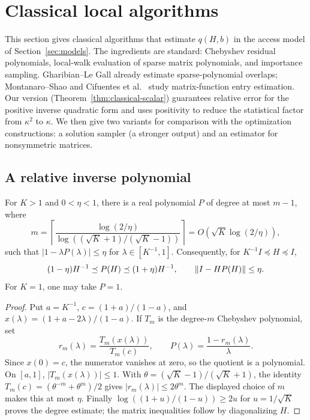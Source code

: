 \section{Classical local algorithms}\label{sec:classical}
This section gives classical algorithms that estimate $q(H,b)$ in the
access model of Section~\ref{sec:models}. The ingredients are standard:
Chebyshev residual polynomials, local-walk evaluation of sparse matrix
polynomials, and importance sampling. Gharibian--Le Gall
\citep{GharibianLeGall2022} already estimate sparse-polynomial overlaps;
Montanaro--Shao \citep{MontanaroShao2023} and
Cifuentes et al.\ \citep{CifuentesEtAl2024} study matrix-function entry
estimation. Our version (Theorem~\ref{thm:classical-scalar}) guarantees
relative error for the positive inverse quadratic form and uses positivity
to reduce the statistical factor from $\kappa^2$ to $\kappa$. We then give
two variants for comparison with the optimization constructions: a
solution sampler (a stronger output) and an estimator for nonsymmetric
matrices.

\subsection{A relative inverse polynomial}
\begin{lemma}\label{lem:residual}
For $K>1$ and $0<\eta<1$, there is a real polynomial $P$ of degree at most
$m-1$, where
\begin{equation}\label{eq:degree}
 m=\left\lceil\frac{\log(2/\eta)}{
       \log((\sqrt K+1)/(\sqrt K-1))}\right\rceil
       =O(\sqrt K\log(2/\eta)),
\end{equation}
such that $|1-\lambda P(\lambda)|\leq\eta$ for
$\lambda\in[K^{-1},1]$. Consequently, for
$K^{-1}I\preceq H\preceq I$,
\begin{equation}\label{eq:relative-polynomial}
 (1-\eta)H^{-1}\preceq P(H)\preceq(1+\eta)H^{-1},\qquad
 \left\lVert I-HP(H)\right\rVert\leq\eta.
\end{equation}
For $K=1$, one may take $P=1$.
\end{lemma}
\begin{proof}
Put $a=K^{-1}$, $c=(1+a)/(1-a)$, and
$x(\lambda)=(1+a-2\lambda)/(1-a)$. If $T_m$ is the degree-$m$
Chebyshev polynomial, set
\[
 r_m(\lambda)=\frac{T_m(x(\lambda))}{T_m(c)},\qquad
 P(\lambda)=\frac{1-r_m(\lambda)}{\lambda}.
\]
Since $x(0)=c$, the numerator vanishes at zero, so the quotient is a
polynomial. On $[a,1]$, $|T_m(x(\lambda))|\leq1$. With
$\theta=(\sqrt K-1)/(\sqrt K+1)$, the identity
$T_m(c)=(\theta^{-m}+\theta^m)/2$ gives
$|r_m(\lambda)|\leq2\theta^m$. The displayed choice of $m$ makes this at
most $\eta$. Finally
$\log((1+u)/(1-u))\geq2u$ for $u=1/\sqrt K$ proves the degree estimate;
the matrix inequalities follow by diagonalizing $H$.
\end{proof}

